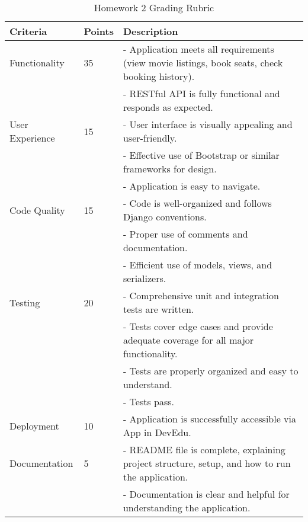 \documentclass{article}
\begin{document}
\begin{table}[ht]
\centering
\small
\begin{tabular}{l l p{8cm}}
\hline
\textbf{Criteria} & \textbf{Points} & \textbf{Description} \\
\hline
Functionality &
35 &
- Application meets all requirements (view movie listings, book seats, check booking history).\\
& &
- RESTful API is fully functional and responds as expected. \newline \\
User Experience &
15 &
- User interface is visually appealing and user-friendly.\\
& &
- Effective use of Bootstrap or similar frameworks for design.\\
& &
- Application is easy to navigate. \newline \\
Code Quality &
15 &
- Code is well-organized and follows Django conventions. \\
& &
- Proper use of comments and documentation. \\
& &
- Efficient use of models, views, and serializers. \newline \\
Testing &
20 &
- Comprehensive unit and integration tests are written.\\
& &
- Tests cover edge cases and provide adequate coverage for all major functionality.\\
& &
- Tests are properly organized and easy to understand. \\
& & 
- Tests pass. \newline \\
Deployment &
10 &
- Application is successfully accessible via App in DevEdu. \newline \\ 
Documentation &
5 &
- README file is complete, explaining project structure, setup, and how to run the application.\\
& &
- Documentation is clear and helpful for understanding the application.\\
\hline
\end{tabular}
\caption{Homework 2 Grading Rubric}
\end{table}
\end{document}

